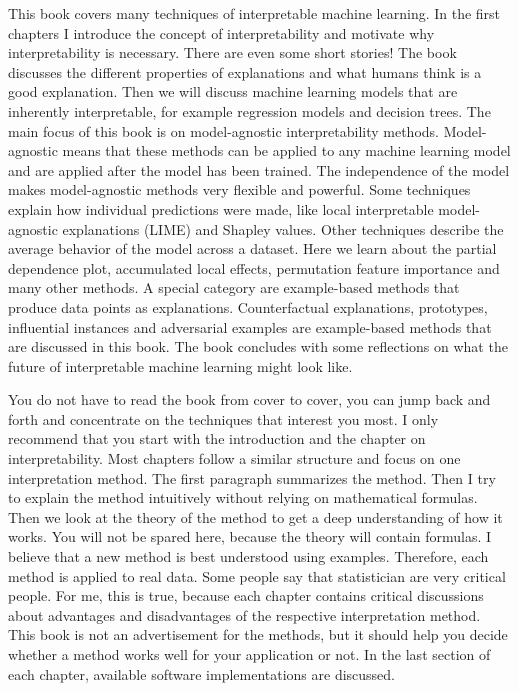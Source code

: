 \documentclass[12pt,]{krantz}
\begin{document}
This book covers many techniques of interpretable machine learning. In
the first chapters I introduce the concept of interpretability and
motivate why interpretability is necessary. There are even some short
stories! The book discusses the different properties of explanations and
what humans think is a good explanation. Then we will discuss machine
learning models that are inherently interpretable, for example
regression models and decision trees. The main focus of this book is on
model-agnostic interpretability methods. Model-agnostic means that these
methods can be applied to any machine learning model and are applied
after the model has been trained. The independence of the model makes
model-agnostic methods very flexible and powerful. Some techniques
explain how individual predictions were made, like local interpretable
model-agnostic explanations (LIME) and Shapley values. Other techniques
describe the average behavior of the model across a dataset. Here we
learn about the partial dependence plot, accumulated local effects,
permutation feature importance and many other methods. A special
category are example-based methods that produce data points as
explanations. Counterfactual explanations, prototypes, influential
instances and adversarial examples are example-based methods that are
discussed in this book. The book concludes with some reflections on what
the future of interpretable machine learning might look like.

You do not have to read the book from cover to cover, you can jump back
and forth and concentrate on the techniques that interest you most. I
only recommend that you start with the introduction and the chapter on
interpretability. Most chapters follow a similar structure and focus on
one interpretation method. The first paragraph summarizes the method.
Then I try to explain the method intuitively without relying on
mathematical formulas. Then we look at the theory of the method to get a
deep understanding of how it works. You will not be spared here, because
the theory will contain formulas. I believe that a new method is best
understood using examples. Therefore, each method is applied to real
data. Some people say that statistician are very critical people. For
me, this is true, because each chapter contains critical discussions
about advantages and disadvantages of the respective interpretation
method. This book is not an advertisement for the methods, but it should
help you decide whether a method works well for your application or not.
In the last section of each chapter, available software implementations
are discussed.
\end{document}
